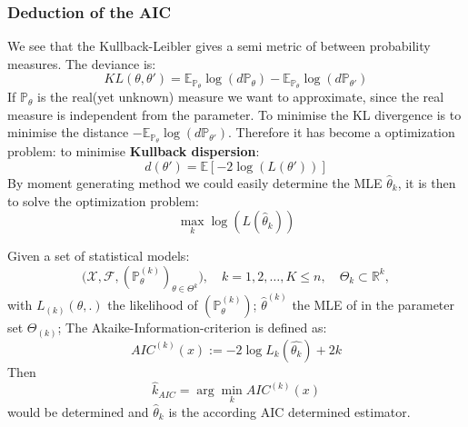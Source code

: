 \subsubsection{Deduction of the AIC}
We see that the Kullback-Leibler gives a semi metric of between probability measures. The deviance is:
\begin{equation*}
	KL(\theta, \theta') = \mathbb{E}_{\mathbb{P}_\theta} \log(d\mathbb{P}_\theta) - \mathbb{E}_{\mathbb{P}_\theta} \log(d\mathbb{P}_{\theta'})
\end{equation*}
If $\mathbb{P}_\theta$ is the real(yet unknown) measure we want to approximate, since the real measure is independent from the parameter. To minimise the KL divergence is to minimise the distance $-\mathbb{E}_{\mathbb{P}_\theta} \log(d\mathbb{P}_{\theta'})$. Therefore it has become a optimization problem: to minimise \textbf{Kullback dispersion}: 
\begin{equation*}
    d(\theta') = \mathbb{E}[-2\log (L(\theta'))]
\end{equation*}
By moment generating method we could easily determine the MLE $\hat{\theta}_k$, it is then to solve the optimization problem:
\begin{equation*}
		\max_k \log(L(\hat{\theta}_k))
\end{equation*}




\begin{definition}[AIC]
Given a set of statistical models:
\begin{equation*}
    \bigg(\mathcal{X}, \mathcal{F}, (\mathbb{P}_\theta^{(k)})_{\theta \in \Theta^k}\bigg), \quad k = 1, 2, \dots, K \leq n,\quad \Theta_k \subset \mathbb{R}^k,
\end{equation*}
with
$L_{(k)}(\theta, .)$ the likelihood of $(\mathbb{P}_\theta^{(k)})$; 
$\hat{\theta}^{(k)}$ the MLE of in the parameter set $\Theta_{(k)}$; 
The Akaike-Information-criterion is defined as:
\begin{equation}
    AIC^{(k)}(x) := -2\log L_k(\hat{\theta_k}) + 2k
\end{equation}
Then 
\begin{equation}
    \hat{k}_{AIC} = \arg \min_k AIC^{(k)}(x)
\end{equation} would be determined and $\hat{\theta}_k$ is the according AIC determined estimator. 
\end{definition}

